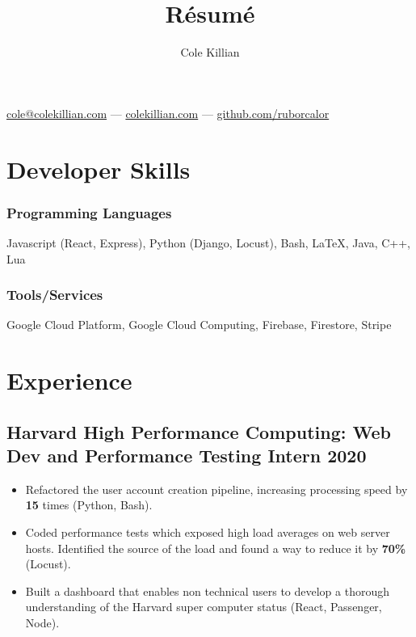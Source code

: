 \documentclass{article}
\makeatletter
\renewcommand{\maketitle}{
\begin{center}
{\color{black}\huge\bfseries
\theauthor}

\vspace{.25em}
\href{mailto:cole@colekillian.com}{cole@colekillian.com} --- \href{https://colekillian.com}{colekillian.com} --- \href{https://github.com/ruborcalor}{github.com/ruborcalor} 
\end{center}
}
\makeatother
\begin{document}
\title{R\'esum\'e}
\author{Cole Killian}

\maketitle
\thispagestyle{empty} 

\section{Developer Skills\hfill\normalsize}

\subsubsection{Programming Languages} 
\hfill Javascript (React, Express), Python (Django, Locust), Bash, \LaTeX, Java, C++, Lua
\subsubsection{Tools/Services}
\hfill Google Cloud Platform, Google Cloud Computing, Firebase, Firestore, Stripe

\section{Experience}

\subsection{Harvard High Performance Computing: Web Dev and Performance Testing Intern \hfill 2020}
\begin{itemize}[leftmargin=0.5in]
  \setlength\itemsep{0.00em}
  \item Refactored the user account creation pipeline, increasing processing speed by \textbf{15} times (Python, Bash).
  \item Coded performance tests which exposed high load averages on web server hosts. Identified the source of the load and found a way to reduce it by \textbf{70\%} (Locust).
  \item Built a dashboard that enables non technical users to develop a thorough understanding of the Harvard super computer status (React, Passenger, Node).
    
\end{itemize}
\end{document}
